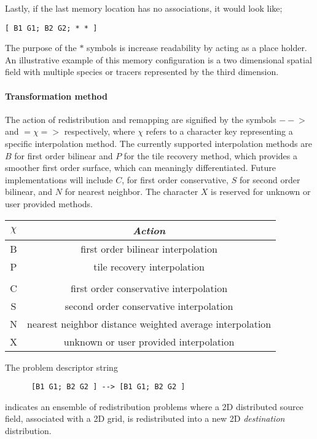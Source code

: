 Lastly, if the last memory location has no associations, it would look like;
\begin{center}
\begin{verbatim}
[ B1 G1; B2 G2; * * ]
\end{verbatim}
\end{center}
The purpose of the $\ast$ symbols is increase readability by acting as a place holder. 
An illustrative example of this memory configuration is a two dimensional spatial field 
with multiple species or tracers represented by the third dimension.

\paragraph{Transformation method}
The action of redistribution and remapping are signified by the symbols $-- \!\!\! >$ and $=\chi=>$ 
respectively, where $\chi$ refers to a character key representing a specific interpolation method. 
The currently supported interpolation methods are $B$ for first order bilinear and $P$ 
for the tile recovery method, which provides a smoother first order surface, which can meaningly differentiated. 
Future implementations will include $C$, for first order conservative, $S$ for second order bilinear, 
and $N$ for nearest neighbor. The character $X$ is reserved for unknown or user provided methods. 

\begin{center}
\begin{tabular}{| c | c |} \hline 
{$\chi$} & {\em Action} \\
\hline \hline
  B & first order bilinear interpolation \\
  P & tile recovery interpolation \\
    &                                        \\
  C & first order conservative interpolation \\
  S & second order conservative interpolation \\
  N & nearest neighbor distance weighted average interpolation \\
  X & unknown or user provided interpolation \\
\hline
\end{tabular}
\end{center}

The problem descriptor string
\begin{center}
\begin{verbatim}
      [B1 G1; B2 G2 ] --> [B1 G1; B2 G2 ]
\end{verbatim}
\end{center}
indicates an ensemble of redistribution problems where a 2D distributed source field, associated with a 2D grid, is redistributed into a new  2D {\em destination} distribution. 

